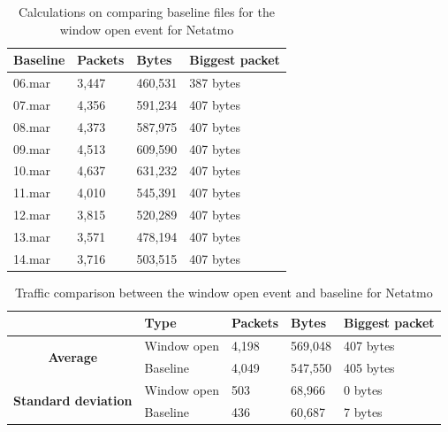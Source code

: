 \begin{table}[H]
    \centering
    \caption{Calculations on comparing baseline files for the window open event for Netatmo}
    \begin{tabular}{|l|l|l|l|}
    \hline
        \textbf{Baseline} & \textbf{Packets} & \textbf{Bytes} & \textbf{Biggest packet} \\ \hline
        06.mar & 3,447 & 460,531 & 387 bytes\\ \hline
        07.mar & 4,356 & 591,234 & 407 bytes\\ \hline
        08.mar & 4,373 & 587,975 & 407 bytes \\ \hline
        09.mar & 4,513 & 609,590 & 407 bytes \\ \hline
        10.mar & 4,637 & 631,232 & 407 bytes \\ \hline
        11.mar & 4,010 & 545,391 & 407 bytes \\ \hline
        12.mar & 3,815 & 520,289 & 407 bytes \\ \hline
        13.mar & 3,571 & 478,194 & 407 bytes \\ \hline
        14.mar & 3,716 & 503,515 & 407 bytes \\ \hline
    \end{tabular}
    \label{tab:NetatmoBaselineWindowCalculations}
\end{table}

\begin{table}[H]
    \centering
    \caption{Traffic comparison between the window open event and baseline for Netatmo}
    \begin{tabular}{c|l|l|l|l|}
        \cline{2-5}
        \multicolumn{1}{l|}{}                                              & \textbf{Type} & \textbf{Packets} & \textbf{Bytes} & \textbf{Biggest packet} \\ \hline
        \multicolumn{1}{|c|}{\multirow{2}{*}{\textbf{Average}}}            & Window open         & 4,198            & 569,048        & 407 bytes               \\ \cline{2-5} 
        \multicolumn{1}{|c|}{}                                             & Baseline      & 4,049            & 547,550        & 405 bytes                \\ \hline
        \multicolumn{1}{|c|}{\multirow{2}{*}{\textbf{Standard deviation}}} & Window open         & 503              & 68,966         & 0 bytes                 \\ \cline{2-5} 
        \multicolumn{1}{|c|}{}                                             & Baseline      & 436              & 60,687         & 7 bytes               \\ \hline          
    \end{tabular}
    \label{tab:NetatmoComparingBaselineAndWindowCalculations}
\end{table}

